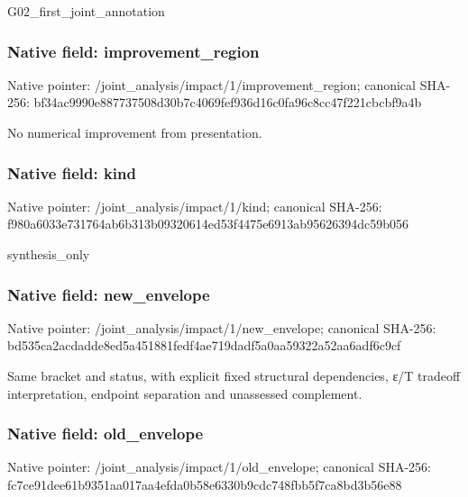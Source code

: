 \documentclass[10pt,a4paper]{article}
\begin{document}
\begingroup\raggedright\sloppy G02\_\allowbreak{}first\_\allowbreak{}joint\_\allowbreak{}annotation\par\endgroup

\subsubsection{Native field: improvement\_\allowbreak{}region}
Native pointer: /joint\_\allowbreak{}analysis/impact/1/improvement\_\allowbreak{}region; canonical SHA-256: bf34ac9990e887737508d30b7c4069fef936d16c0fa96c8cc47f221cbcbf9a4b

\begingroup\raggedright\sloppy No numerical improvement from presentation.\par\endgroup

\subsubsection{Native field: kind}
Native pointer: /joint\_\allowbreak{}analysis/impact/1/kind; canonical SHA-256: f980a6033e731764ab6b313b09320614ed53f4475e6913ab95626394dc59b056

\begingroup\raggedright\sloppy synthesis\_\allowbreak{}only\par\endgroup

\subsubsection{Native field: new\_\allowbreak{}envelope}
Native pointer: /joint\_\allowbreak{}analysis/impact/1/new\_\allowbreak{}envelope; canonical SHA-256: bd535ca2acdadde8ed5a451881fedf4ae719dadf5a0aa59322a52aa6adf6c9cf

\begingroup\raggedright\sloppy Same bracket and status,\allowbreak{} with explicit fixed structural dependencies,\allowbreak{} {\AtlasUnicodeText ε}\allowbreak{}/\allowbreak{}T tradeoff interpretation,\allowbreak{} endpoint separation and unassessed complement.\par\endgroup

\subsubsection{Native field: old\_\allowbreak{}envelope}
Native pointer: /joint\_\allowbreak{}analysis/impact/1/old\_\allowbreak{}envelope; canonical SHA-256: fc7ce91dee61b9351aa017aa4efda0b58e6330b9cdc748fbb5f7ca8bd3b56e88
\end{document}
